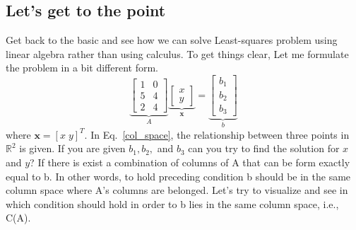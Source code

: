 \documentclass[12pt]{article}%
\begin{document}
\subsection{Let's get to the point}\label{sec:vector_space}
Get back to the basic and see how we can solve Least-squares problem using linear algebra rather than using calculus. To get things clear, Let me formulate the problem in a bit different form. 
\begin{equation}\label{col_space}
   \underbrace{\begin{bmatrix}
1 & 0\\ 
5 & 4\\ 
2 & 4
\end{bmatrix}}_A\underbrace{\begin{bmatrix}
x\\ 
y
\end{bmatrix}}_{\mathbf{x}} = \underbrace{\begin{bmatrix}
b_1\\ 
b_2
\\ 
b_3
\end{bmatrix}}_b
\end{equation} where $\mathbf{x} = [x \; y]^T$. In Eq.~\ref{col_space}, the relationship between three points in  $\mathbb{R}^2$ is given. If you are given $b_1, b_2,$ and $b_3$ can you try to find the solution for $x$ and $y$? If there is exist a combination of columns of A that can be form exactly equal to b. In other words, to hold preceding condition b should be in the same column space where A's columns are belonged.  Let's try to visualize and see in which condition should hold in order to b lies in the same column space, i.e., C(A).

\end{document}
